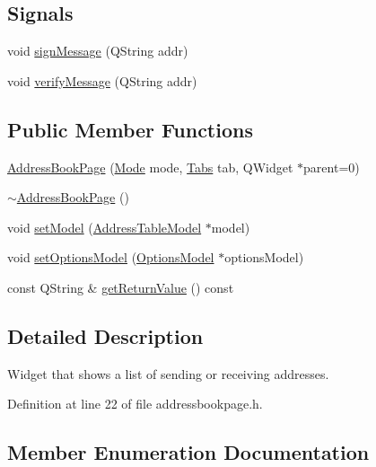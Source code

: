 \subsection*{Signals}
\begin{DoxyCompactItemize}
\item 
void \hyperlink{class_address_book_page_a5a5258459403cb0e841d50e4c6bb6f3b}{sign\+Message} (Q\+String addr)
\item 
void \hyperlink{class_address_book_page_a6050d81accc38fd0e3c469002ea3142f}{verify\+Message} (Q\+String addr)
\end{DoxyCompactItemize}
\subsection*{Public Member Functions}
\begin{DoxyCompactItemize}
\item 
\hyperlink{class_address_book_page_ad53c82a9181ae7627c06b9c49971ec52}{Address\+Book\+Page} (\hyperlink{class_address_book_page_a0a8f8e590dc6f18e829fde039f984464}{Mode} mode, \hyperlink{class_address_book_page_a7ef3cf6c3e4613894af313a05335dbe3}{Tabs} tab, Q\+Widget $\ast$parent=0)
\item 
\hyperlink{class_address_book_page_a8f81beda9c99fc10c454fc1505a081d3}{$\sim$\+Address\+Book\+Page} ()
\item 
void \hyperlink{class_address_book_page_a1282cda9cb0300ee04c472ec4c9949f3}{set\+Model} (\hyperlink{class_address_table_model}{Address\+Table\+Model} $\ast$model)
\item 
void \hyperlink{class_address_book_page_ab9667b2b14e6bf56aeb256402fe6ac7e}{set\+Options\+Model} (\hyperlink{class_options_model}{Options\+Model} $\ast$options\+Model)
\item 
const Q\+String \& \hyperlink{class_address_book_page_a204f9ff847c26eb900fac7a3d0a6ab4f}{get\+Return\+Value} () const 
\end{DoxyCompactItemize}


\subsection{Detailed Description}
Widget that shows a list of sending or receiving addresses. 

Definition at line 22 of file addressbookpage.\+h.



\subsection{Member Enumeration Documentation}
\hypertarget{class_address_book_page_a0a8f8e590dc6f18e829fde039f984464}{}
